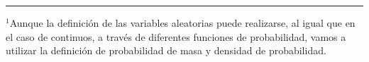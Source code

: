 \begin{frame}
\begin{itemize}
\begin{itemize}

\end{itemize}


\end{itemize}

\vspace{-0.3cm}

\rule{11cm}{0.04ex}
\scriptsize
$^1$Aunque la definición de las variables aleatorias puede realizarse, al igual que en el caso de continuos, a través de diferentes funciones de probabilidad, vamos a utilizar la definición de probabilidad de masa y densidad de probabilidad.


\end{frame}


